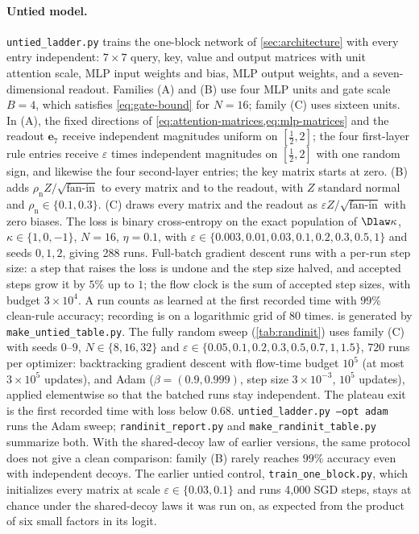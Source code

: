 \paragraph{Untied model.}
\texttt{untied\_ladder.py} trains the one-block network of \cref{sec:architecture} with every entry independent:
$7\times7$ query, key, value and output matrices with unit attention scale, MLP input weights and bias, MLP output weights, and a seven-dimensional readout.
Families (A) and (B) use four MLP units and gate scale $B=4$, which satisfies \cref{eq:gate-bound} for $N=16$; family (C) uses sixteen units.
In (A), the fixed directions of \cref{eq:attention-matrices,eq:mlp-matrices} and the readout $\bm e_7$ receive independent magnitudes uniform on $[\tfrac{1}{2},2]$;
the four first-layer rule entries receive $\varepsilon$ times independent magnitudes on $[\tfrac{1}{2},2]$ with one random sign, and likewise the four second-layer entries;
the key matrix starts at zero. (B) adds $\rho_{\mathrm n}Z/\sqrt{\text{fan-in}}$ to every matrix and to the readout, with $Z$ standard normal and $\rho_{\mathrm n}\in\{0.1,0.3\}$.
(C) draws every matrix and the readout as $\varepsilon Z/\sqrt{\text{fan-in}}$ with zero biases.
The loss is binary cross-entropy on the exact population of $\Dlaw\kappa$, $\kappa\in\{1,0,-1\}$, $N=16$, $\eta=0.1$,
with $\varepsilon\in\{0.003,0.01,0.03,0.1,0.2,0.3,0.5,1\}$ and seeds $0,1,2$, giving 288 runs.
Full-batch gradient descent runs with a per-run step size: a step that raises the loss is undone and the step size halved,
and accepted steps grow it by $5\%$ up to $1$; the flow clock is the sum of accepted step sizes, with budget $3\times10^4$.
A run counts as learned at the first recorded time with $99\%$ clean-rule accuracy; recording is on a logarithmic grid of 80 times.
 is generated by \texttt{make\_untied\_table.py}.
The fully random sweep (\cref{tab:randinit}) uses family (C) with seeds $0$--$9$, $N\in\{8,16,32\}$ and $\varepsilon\in\{0.05,0.1,0.2,0.3,0.5,0.7,1,1.5\}$, $720$ runs per optimizer:
backtracking gradient descent with flow-time budget $10^5$ (at most $3\times10^5$ updates), and Adam ($\beta=(0.9,0.999)$, step size $3\times10^{-3}$, $10^5$ updates),
applied elementwise so that the batched runs stay independent. The plateau exit is the first recorded time with loss below $0.68$.
\texttt{untied\_ladder.py --opt adam} runs the Adam sweep; \texttt{randinit\_report.py} and \texttt{make\_randinit\_table.py} summarize both.
With the shared-decoy law of earlier versions, the same protocol does not give a clean comparison: family (B) rarely reaches $99\%$ accuracy even with independent decoys.
The earlier untied control, \texttt{train\_one\_block.py}, which initializes every matrix at scale $\varepsilon\in\{0.03,0.1\}$ and runs 4{,}000 SGD steps,
stays at chance under the shared-decoy laws it was run on, as expected from the product of six small factors in its logit.

